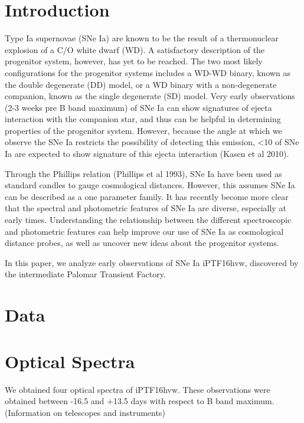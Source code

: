 \documentclass[twoside,twocolumn]{article}
\begin{document}
\marginpar



\begin{abstract}


\end{abstract}

\section{Introduction}

Type Ia supernovae (SNe Ia) are known to be the result of a thermonuclear explosion of a C/O white dwarf (WD). A satisfactory description of the progenitor system, however, has yet to be reached. The two most likely configurations for the progenitor systems includes a WD-WD binary, known as the double degenerate (DD) model, or a WD binary with a non-degenerate companion, known as the single degenerate (SD) model. Very early observations (2-3 weeks pre B band maximum) of SNe Ia can show signatures of ejecta interaction with the companion star, and thus can be helpful in determining properties of the progenitor system. However, because the angle at which we observe the SNe Ia restricts the possibility of detecting this emission, <10 of SNe Ia are expected to show signature of this ejecta interaction (Kasen et al 2010).
    
    Through the Phillips relation (Phillips et al 1993), SNe Ia have been used as standard candles to gauge cosmological distances. However, this assumes SNe Ia can be described as a one parameter family. It has recently become more clear that the spectral and photometric features of SNe Ia are diverse, especially at early times. Understanding the relationship between the different spectroscopic and photometric features can help improve our use of SNe Ia as cosmological distance probes, as well as uncover new ideas about the progenitor systems.
    
In this paper, we analyze early observations of SNe Ia iPTF16hvw, discovered by the intermediate Palomar Transient Factory. 
 
\section{Data}
\section{Optical Spectra}
We obtained four optical spectra of iPTF16hvw. These observations were obtained between -16.5 and +13.5 days with respect to B band maximum. (Information on telescopes and instruments)
\end{document}
